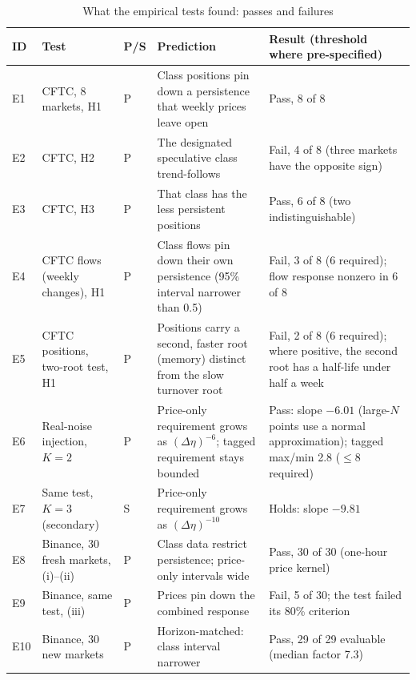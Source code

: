 \documentclass[12pt]{article}
\theoremstyle{definition}
\theoremstyle{remark}
\begin{document}
\begin{table}[!htbp]\centering\scriptsize\let\footnotesize\scriptsize
\begin{threeparttable}
\caption{What the empirical tests found: passes and failures}\label{tab:scorecard}
\setlength{\tabcolsep}{3pt}
\begin{tabular}{>{\raggedright\arraybackslash}p{}>{\raggedright\arraybackslash}p{}>{\centering\arraybackslash}p{}>{\raggedright\arraybackslash}p{}>{\raggedright\arraybackslash}p{}}
\toprule
ID & Test & P/S & Prediction & Result (threshold where pre-specified)\\
\midrule
E1 & CFTC, 8 markets, H1 & P & Class positions pin down a persistence that weekly prices leave open & Pass, 8 of 8\\
E2 & CFTC, H2 & P & The designated speculative class trend-follows & Fail, 4 of 8 (three markets have the opposite sign)\\
E3 & CFTC, H3 & P & That class has the less persistent positions & Pass, 6 of 8 (two indistinguishable)\\
E4 & CFTC flows (weekly changes), H1 & P & Class flows pin down their own persistence (95\% interval narrower than 0.5) & Fail, 3 of 8 (6 required); flow response nonzero in 6 of 8\\
E5 & CFTC positions, two-root test, H1 & P & Positions carry a second, faster root (memory) distinct from the slow turnover root & Fail, 2 of 8 (6 required); where positive, the second root has a half-life under half a week\\
E6 & Real-noise injection, $K=2$ & P & Price-only requirement grows as $(\Delta\eta)^{-6}$; tagged requirement stays bounded & Pass: slope $-6.01$ (large-$N$ points use a normal approximation); tagged max/min 2.8 ($\le8$ required)\\
E7 & Same test, $K=3$ (secondary) & S & Price-only requirement grows as $(\Delta\eta)^{-10}$ & Holds: slope $-9.81$\\
E8 & Binance, 30 fresh markets, (i)--(ii) & P & Class data restrict persistence; price-only intervals wide & Pass, 30 of 30 (one-hour price kernel)\\
E9 & Binance, same test, (iii) & P & Prices pin down the combined response & Fail, 5 of 30; the test failed its 80\% criterion\\
E10 & Binance, 30 new markets & P & Horizon-matched: class interval narrower & Pass, 29 of 29 evaluable (median factor 7.3)\\

\end{tabular}
\end{threeparttable}
\end{table}
\end{document}
